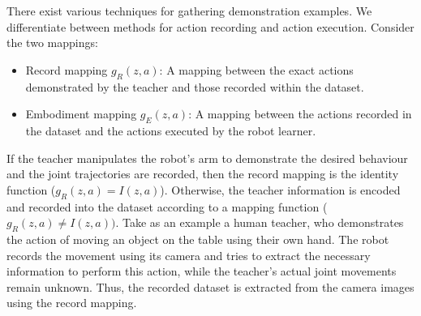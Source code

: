 There exist various techniques for gathering demonstration examples. We differentiate between methods for action recording and action execution. Consider the two mappings: \cite{argall2009survey}
\begin{itemize}
\item Record mapping $g_R(z,a)$: A mapping between the exact actions demonstrated by the teacher and those recorded within the dataset.
\item Embodiment mapping $g_E(z,a)$: A mapping between the actions recorded in the dataset and the actions executed by the robot learner.
\end{itemize}
If the teacher manipulates the robot's arm to demonstrate the desired behaviour and the joint trajectories are recorded, then the record mapping is the identity function ($g_R(z,a) = I(z,a)$). Otherwise, the teacher information is encoded and recorded into the dataset according to a mapping function ($g_R(z,a) \neq I(z,a))$. Take as an example a human teacher, who demonstrates the action of moving an object on the table using their own hand. The robot records the movement using its camera and tries to extract the necessary information to perform this action, while the teacher's actual joint movements remain unknown. Thus, the recorded dataset is extracted from the camera images using the record mapping.

